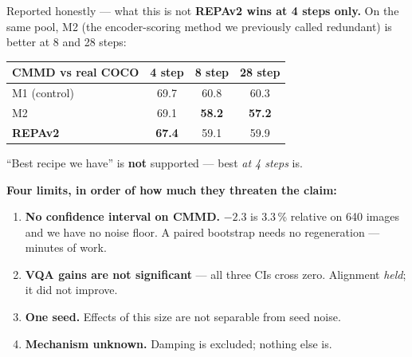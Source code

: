 \documentclass[10pt,aspectratio=169]{beamer}
\newcommand{\bad}[1]{\textcolor{bad}{\textbf{#1}}}
\begin{document}
\begin{frame}{Reported honestly --- what this is not}
  \textbf{REPAv2 wins at 4 steps only.} On the same pool, M2 (the encoder-scoring method we
  previously called redundant) is better at 8 and 28 steps:

  \begin{center}
  \begin{tabular}{lccc}
    \toprule
    CMMD vs real COCO & 4 step & 8 step & 28 step \\
    \midrule
    M1 (control) & 69.7 & 60.8 & 60.3 \\
    M2 & 69.1 & \textbf{58.2} & \textbf{57.2} \\
    \textbf{REPAv2} & \textbf{67.4} & 59.1 & 59.9 \\
    \bottomrule
  \end{tabular}
  \end{center}

  \vspace{0.4em}
  ``Best recipe we have'' is \bad{not} supported --- best \emph{at 4 steps} is.

  \vspace{0.6em}
  \textbf{Four limits, in order of how much they threaten the claim:}
  \begin{enumerate}
    \item \bad{No confidence interval on CMMD.} $-2.3$ is 3.3\,\% relative on 640 images and we
          have no noise floor. A paired bootstrap needs no regeneration --- minutes of work.
    \item \textbf{VQA gains are not significant} --- all three CIs cross zero. Alignment
          \emph{held}; it did not improve.
    \item \textbf{One seed.} Effects of this size are not separable from seed noise.
    \item \textbf{Mechanism unknown.} Damping is excluded; nothing else is.
  \end{enumerate}
\end{frame}
\end{document}
